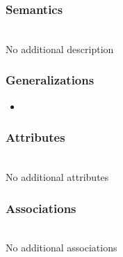 \documentclass{article}
\begin{document}
\subsubsection*{Semantics} ~\\ No additional description
\subsubsection*{Generalizations}
\begin{itemize}
\item {}
\end{itemize}
\subsubsection*{Attributes} ~\\ No additional attributes
\subsubsection*{Associations} ~\\ No additional associations
\end{document}
